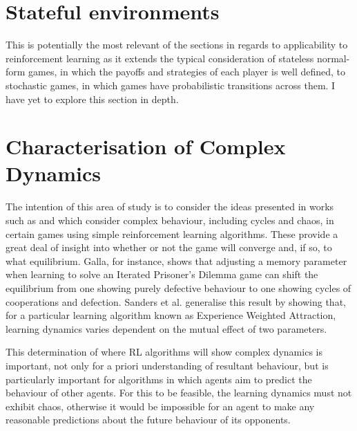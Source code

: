 \documentclass[../sample.tex]{subfiles}
\begin{document}
    \section{Stateful environments} \label{sec::Stateful}

    This is potentially the most relevant of the sections in regards to applicability to
    reinforcement learning as it extends the typical consideration of stateless normal-form games,
    in which the payoffs and strategies of each player is well defined, to stochastic games, in
    which games have probabilistic transitions across them. I have yet to explore this section in
    depth.

    \section{Characterisation of Complex Dynamics}

    The intention of this area of study is to consider the ideas presented in works such as 
    \cite{Sanders2018} and \cite{Galla2011} which consider complex behaviour, including cycles and
    chaos, in certain games using simple reinforcement learning algorithms. These provide a great
    deal of insight into whether or not the game will converge and, if so, to what equilibrium.
    Galla, for instance, shows that adjusting a memory parameter when learning to solve an Iterated
    Prisoner's Dilemma game can shift the equilibrium from one showing purely defective behaviour to
    one showing cycles of cooperations and defection. Sanders et al. generalise this result by
    showing that, for a particular learning algorithm known as Experience Weighted Attraction,
    learning dynamics varies dependent on the mutual effect of two parameters. 

    This determination of where RL algorithms will show complex dynamics is important, not only for
    a priori understanding of resultant behaviour, but is particularly important for algorithms in
    which agents aim to predict the behaviour of other agents. For this to be feasible, the learning
    dynamics must not exhibit chaos, otherwise it would be impossible for an agent to make any
    reasonable predictions about the future behaviour of its opponents. 
    
\end{document}
